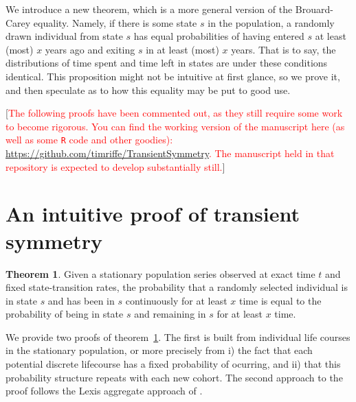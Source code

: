 \documentclass[12pt,oneside,a4paper]{article}
\theoremstyle{definition}
\newtheorem{theorem}{Theorem}[section]
\begin{document}
We introduce a new
theorem, which is a more general version of the Brouard-Carey equality.
Namely, if there is some state $s$ in the population, a
randomly drawn individual from state $s$ has equal probabilities of having
entered $s$ at least (most) $x$ years ago and exiting $s$ in at least (most) $x$ years. That is to say, the distributions of time spent and time left in states are under these conditions identical. This proposition
might not be intuitive at first glance, so we prove it, and then speculate
as to how this equality may be put to good use. 

\vspace{1em}

[\textcolor{red}{The following proofs have been commented out, as they still require some work to become rigorous. You can find the working version of the manuscript here (as well as some \texttt{R} code and other goodies): \url{https://github.com/timriffe/TransientSymmetry}. The manuscript held in that repository is expected to develop substantially still.}]

\section{An intuitive proof of transient symmetry}
\FloatBarrier

\begin{theorem}
\label{th}
Given a stationary population series observed at exact time $t$ and fixed state-transition
rates, the probability that a randomly selected individual is in state $s$ and has been in $s$ continuously for at least $x$ time is equal to the probability of being in state $s$ and remaining in $s$ for at least $x$ time.
\end{theorem}

We provide two proofs of theorem~\ref{th}. The first is built from individual
life courses in the stationary population, or more precisely from i) the fact
that each potential discrete lifecourse has a fixed probability of ocurring,
 and ii) that this probability structure repeats with each new cohort.
The second approach to the proof follows the Lexis aggregate approach of
\citet{villavicencioRiffeSymmetires2016}.
\end{document}
